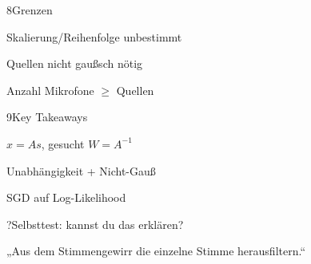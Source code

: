 \begin{hngrid}
\begin{hnp}[raster multicolumn=2,acc=hnred]{8}{Grenzen}
\begin{hncon}
\item Skalierung/Reihenfolge unbestimmt
\item Quellen nicht gaußsch nötig
\item Anzahl Mikrofone $\ge$ Quellen
\end{hncon}
\end{hnp}
%
\begin{hnp}[raster multicolumn=2,acc=hnorange]{9}{Key Takeaways}
\begin{hnchk}
\item $x=As$, gesucht $W=A^{-1}$
\item Unabhängigkeit + Nicht-Gauß
\item SGD auf Log-Likelihood
\end{hnchk}
\end{hnp}
%
\begin{hnp}[raster multicolumn=6,acc=hnpurple,colback=hnlilac!30]{?}{Selbsttest: kannst du das erklären?}
\end{hnp}
%
\begin{hnbanner}[raster multicolumn=6]
„Aus dem Stimmengewirr die einzelne Stimme herausfiltern.“
\end{hnbanner}
\end{hngrid}
